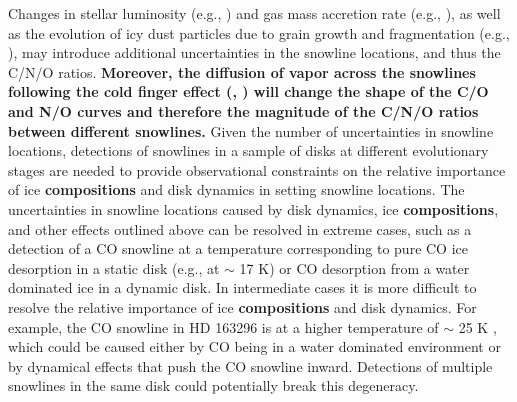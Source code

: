 \documentclass[apj]{emulateapj}
\begin{document}
Changes in stellar luminosity (e.g., \citealt{kennedy06}) and gas mass accretion rate (e.g., \citealt{chambers09}), as well as the evolution of icy dust particles due to grain growth and fragmentation (e.g., \citealt{birnstiel12}), may introduce additional uncertainties in the snowline locations, and thus the C/N/O ratios. \textbf{Moreover, the diffusion of vapor across the snowlines following the cold finger effect (\citealt{stevenson88}, \citealt{cyr98}) will change the shape of the C/O and N/O curves and therefore the magnitude of the C/N/O ratios between different snowlines.} Given the number of uncertainties in snowline locations, detections of snowlines in a sample of disks at different evolutionary stages are needed to provide observational constraints on the relative importance of ice \textbf{compositions} and disk dynamics in setting snowline locations. The uncertainties in snowline locations caused by disk dynamics, ice \textbf{compositions}, and other effects outlined above can be resolved in extreme cases, such as a detection of a CO snowline at a temperature corresponding to pure CO ice desorption in a static disk (e.g., \citealt{qi13} at $\sim$ 17 K) or CO desorption from a water dominated ice in a dynamic disk. In intermediate cases it is more difficult to resolve the relative importance of ice \textbf{compositions} and disk dynamics. For example, the CO snowline in HD 163296 is at a higher temperature of $\sim$ 25 K \citep{qi15}, which could be caused either by CO being in a water dominated environment or by dynamical effects that push the CO snowline inward. Detections of multiple snowlines in the same disk could potentially break this degeneracy. %

\end{document}
